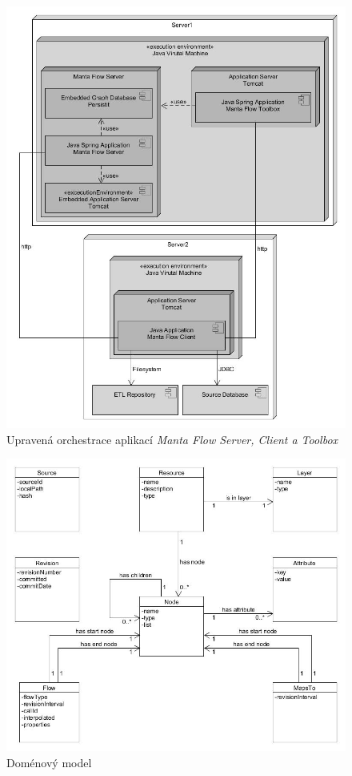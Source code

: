 \documentclass[11pt,twoside,a4paper]{book}
\begin{document}
\begin{figure}
\begin{center}
\includegraphics[width=14cm]{figures/deployment_changed}
\caption{Upravená orchestrace aplikací \textit{Manta Flow Server, Client a Toolbox}}
\label{fig:ana-deployment-changed}
\end{center}
\end{figure}

\begin{figure}
\begin{center}
\includegraphics[width=14cm]{figures/domain_model}
\caption{Doménový model}
\label{fig:impl-domain}
\end{center}
\end{figure}
\end{document}
